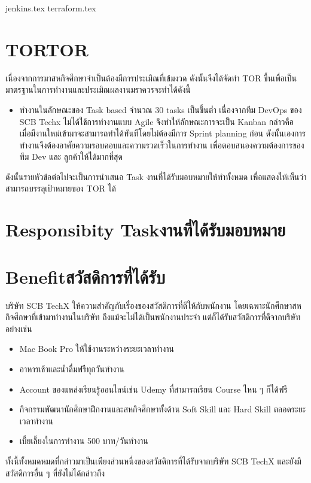 \clearpage
{jenkins.tex}
\clearpage
{terraform.tex}
\clearpage

\section{\ifenglish TOR\else TOR\fi}เนื่องจากการมาสหกิจศึกษาจำเป็นต้องมีการประเมิณที่เข้มงวด ดังนั้นจึงได้จัดทำ TOR ขึ้นเพื่อเป็นมาตรฐานในการทำงานและประเมิณผลงานมราควรจะทำได้ดังนี้
\begin{itemize}
      \item ทำงานในลักษณะของ Task based จำนวณ 30 tasks เป็นขึ้นต่ำ เนื่องจากทีม DevOps ของ SCB Techx ไม่ได้ใช้การทำงานแบบ Agile จึงทำให้ลักษณะการจะเป็น Kanban กล่าวคือ เมื่อมีงานใหม่เข้ามาจะสามารถทำได้ทันทีโดยไม่ต้องมีการ Sprint planning ก่อน ดังนั้นเองการทำงานจึงต้องอาศัยความรอบคอบและความรวดเร็วในการทำงาน เพื่อตอบสนองความต้องการของทีม Dev และ ลูกค้าให้ได้มากที่สุด
\end{itemize}
ดังนั้นรายหัวข้อต่อไปจะเป็นการนำเสนอ Task งานที่ได้รับมอบหมายให้ทำทั้งหมด เพื่อแสดงให้เห็นว่าสามารถบรรลุเป้าหมายของ TOR ได้

\section{\ifenglish Responsibity Task\else งานที่ได้รับมอบหมาย\fi}
\jiradata


\section{\ifenglish Benefit\else สวัสดิการที่ได้รับ\fi}
บริษัท SCB TechX ให้ความสำคัญกับเรื่องของสวัสดิการที่ดีให้กับพนักงาน โดยเฉพาะนักศึกษาสหกิจศึกษาที่เข้ามาทำงานในบริษัท
ถึงแม้จะไม่ได้เป็นพนักงานประจำ แต่ก็ได้รับสวัสดิการที่ดีจากบริษัทอย่างเช่น
\begin{itemize}
      \item Mac Book Pro ให้ใช้งานระหว่างระยะเวลาทำงาน
      \item อาหารเช้าและน้ำดื่มฟรีทุกวันทำงาน
      \item Account ของแหล่งเรียนรู้ออนไลน์เช่น Udemy ที่สามารถเรียน Course ไหน ๆ ก็ได้ฟรี
      \item กิจกรรมพัฒนานักศึกษาฝึกงานและสหกิจศึกษาทั้งด้าน Soft Skill และ Hard Skill ตลอดระยะเวลาทำงาน
      \item เบี้ยเลี้ยงในการทำงาน 500 บาท/วันทำงาน
\end{itemize}
ทั้งนี้ทั้งหมดหมดที่กล่าวมาเป็นเพียงส่วนหนึ่งของสวัสดิการที่ได้รับจากบริษัท SCB TechX และยังมีสวัสดิการอื่น ๆ ที่ยังไม่ได้กล่าวถึง